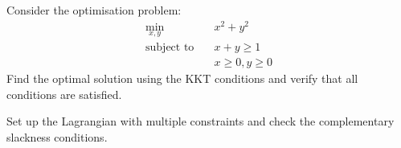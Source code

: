 \begin{exercisebox}[hard]
\begin{problem}
\label{prob:kkt-conditions}
Consider the optimisation problem:
\begin{align}
\min_{x, y} \quad & x^2 + y^2 \\
\text{subject to} \quad & x + y \geq 1 \\
& x \geq 0, y \geq 0
\end{align}
Find the optimal solution using the KKT conditions and verify that all conditions are satisfied.
\end{problem}
\begin{hintbox}
Set up the Lagrangian with multiple constraints and check the complementary slackness conditions.
\end{hintbox}
\end{exercisebox}

